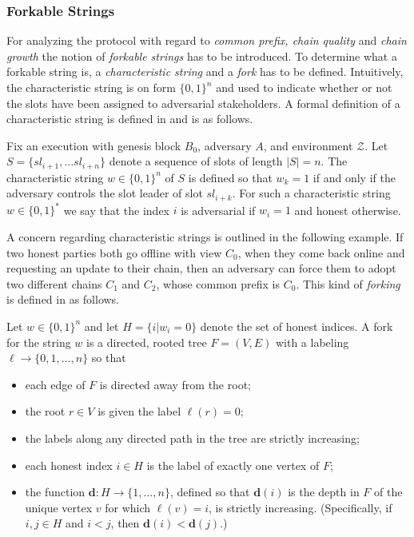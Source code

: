 \subsubsection*{Forkable Strings}

For analyzing the protocol with regard to \emph{common prefix, chain quality} and \emph{chain growth} the notion of \emph{forkable strings} has to be introduced. To determine what a forkable string is, a \emph{characteristic string} and a \emph{fork} has to be defined. Intuitively, the characteristic string is on form $\{0,1\}^n$ and used to indicate whether or not the slots have been assigned to adversarial stakeholders. A formal definition of a characteristic string is defined in \cite{ouroboros} and is as follows.

\begin{mydef}
\label{def:char-string}
Fix an execution with genesis block $B_0$, adversary $A$, and environment $\mathcal{Z}$. Let $S = \{ sl_{i+1}, \ldots sl_{i+n} \}$ denote a sequence of slots of length $|S| = n$. The characteristic string $w \in \{0,1\}^n$ of $S$ is defined so that $w_k = 1$ if and only if the adversary controls the slot leader of slot $sl_{i+k}$. For such a characteristic string $w\in \{0,1\}^{*}$ we say that the index $i$ is adversarial if $w_i = 1$ and honest otherwise.
\end{mydef}

A concern regarding characteristic strings is outlined in the following example. If two honest parties both go offline with view $C_0$, when they come back online and requesting an update to their chain, then an adversary can force them to adopt two different chains $C_1$ and $C_2$, whose common prefix is $C_0$. This kind of \emph{forking} is defined in \cite{ouroboros} as follows.

\begin{mydef}[Fork]
Let $w\in \{0,1\}^n$ and let $H=\{ i | w_i=0 \}$ denote the set of honest indices. A fork for the string $w$ is a directed, rooted tree $F = (V,E)$ with a labeling $\ell \xrightarrow{} \{0,1,\ldots,n\}$ so that
\begin{itemize}
    \item each edge of $F$ is directed away from the root;
    \item the root $r\in V$ is given the label $\ell(r)=0$;
    \item the labels along any directed path in the tree are strictly increasing;
    \item each honest index $i\in H$ is the label of exactly one vertex of $F$;
    \item the function $\textbf{d} : H\xrightarrow{} \{1,\ldots,n\}$, defined so that $\textbf{d}(i)$ is the depth in $F$ of the unique vertex $v$ for which $\ell(v)=i$, is strictly increasing. (Specifically, if $i,j\in H$ and $i<j$, then $\textbf{d}(i) < \textbf{d}(j)$.)
\end{itemize}
\end{mydef}

